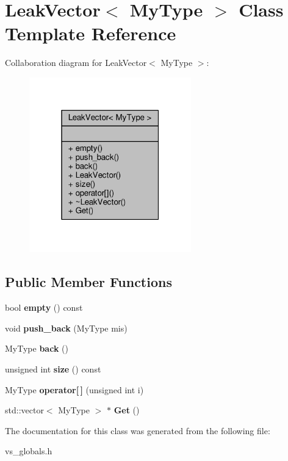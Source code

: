 \hypertarget{classLeakVector}{}\section{Leak\+Vector$<$ My\+Type $>$ Class Template Reference}
\label{classLeakVector}


Collaboration diagram for Leak\+Vector$<$ My\+Type $>$\+:
\nopagebreak
\begin{figure}[H]
\begin{center}
\leavevmode
\includegraphics[width=199pt]{d2/dfa/classLeakVector__coll__graph}
\end{center}
\end{figure}
\subsection*{Public Member Functions}
\begin{DoxyCompactItemize}
\item 
bool {\bfseries empty} () const \hypertarget{classLeakVector_ae5e7707922d6aa7a520da7a5dddb9c5b}{}\label{classLeakVector_ae5e7707922d6aa7a520da7a5dddb9c5b}

\item 
void {\bfseries push\+\_\+back} (My\+Type mis)\hypertarget{classLeakVector_aecf1fa59a814face8cc183aa73b3597c}{}\label{classLeakVector_aecf1fa59a814face8cc183aa73b3597c}

\item 
My\+Type {\bfseries back} ()\hypertarget{classLeakVector_a899619204c8e89ec5441af05d8962b33}{}\label{classLeakVector_a899619204c8e89ec5441af05d8962b33}

\item 
unsigned int {\bfseries size} () const \hypertarget{classLeakVector_a4d1361de2d525fe2dc34d58a70b319fa}{}\label{classLeakVector_a4d1361de2d525fe2dc34d58a70b319fa}

\item 
My\+Type {\bfseries operator\mbox{[}$\,$\mbox{]}} (unsigned int i)\hypertarget{classLeakVector_ae80f9c7296e17c8eebe2fc3f530df37f}{}\label{classLeakVector_ae80f9c7296e17c8eebe2fc3f530df37f}

\item 
std\+::vector$<$ My\+Type $>$ $\ast$ {\bfseries Get} ()\hypertarget{classLeakVector_abb9e4a6620fe666812c868133e530e3f}{}\label{classLeakVector_abb9e4a6620fe666812c868133e530e3f}

\end{DoxyCompactItemize}


The documentation for this class was generated from the following file\+:\begin{DoxyCompactItemize}
\item 
vs\+\_\+globals.\+h\end{DoxyCompactItemize}
